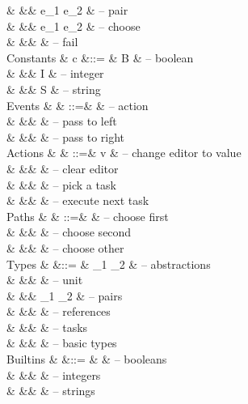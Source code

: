 \begin{grammar}
    &        &\mid& e_1 \And e_2                & – pair \\
    &        &\mid& e_1 \Or e_2                 & – choose \\
    &        &\mid& \Fail                       & – fail \\
  Constants
    & c      &::= & B \in \BB                   & – boolean \\
    &        &\mid& I \in \ZZ                   & – integer \\
    &        &\mid& S \in \SS                   & – string \\
  \addlinespace
  Events
    & \eta   & ::=& \alpha                      & – action \\
    &        &\mid& \Left \eta                  & – pass to left \\
    &        &\mid& \Right \eta                 & – pass to right \\
  Actions
    & \alpha & ::=& v                           & – change editor to value \\
    &        &\mid& \Clear                      & – clear editor \\
    &        &\mid& \Pick \pi                   & – pick a task \\
    &        &\mid& \Next                       & – execute next task \\
  Paths
    & \pi    & ::=& \First                      & – choose first \\
    &        &\mid& \Second                     & – choose second \\
    &        &\mid& \Other \pi                  & – choose other \\
  \addlinespace
  Types
    & \tau   &::= & \tau_1 \to \tau_2           & – abstractions \\
    &        &\mid& \Unit                       & – unit \\
    &        &\mid& \tau_1 \times \tau_2        & – pairs \\
    &        &\mid& \Reference \tau             & – references \\
    &        &\mid& \Task \tau                  & – tasks \\
    &        &\mid& \beta                       & – basic types \\
  Builtins
    & \beta  &::= & \Bool                       & – booleans \\
    &        &\mid& \Int                        & – integers \\
    &        &\mid& \String                     & – strings \\
\end{grammar}


